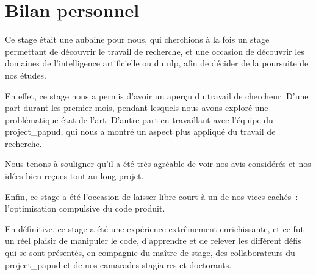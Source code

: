 \section{Bilan personnel}
Ce stage était une aubaine pour nous, qui cherchions à la fois un stage permettant de découvrir le travail de recherche, et une occasion de découvrir les domaines de l'intelligence artificielle ou du \gls{nlp}, afin de décider de la poursuite de nos études.

En effet, ce stage nous a permis d'avoir un aperçu du travail de chercheur. D'une part durant les premier mois, pendant lesquels nous avons exploré une problématique état de l'art. D'autre part en travaillant avec l'équipe du \gls{project_papud}, qui nous a montré un aspect plus appliqué du travail de recherche.

Nous tenons à souligner qu'il a été très agréable de voir nos avis considérés et nos idées bien reçues tout au long projet.

Enfin, ce stage a été l'occasion de laisser libre court à un de nos vices cachés~: l'optimisation compulsive du code produit.

En définitive, ce stage a été une expérience extrêmement enrichissante, et ce fut un réel plaisir de manipuler le code, d'apprendre et de relever les différent défis qui se sont présentés, en compagnie du maître de stage, des collaborateurs du \gls{project_papud} et de nos camarades stagiaires et doctorants.









